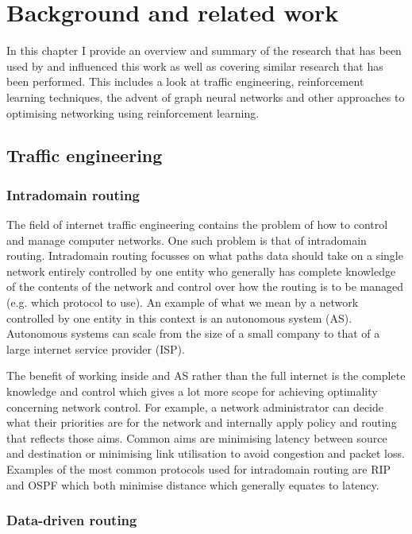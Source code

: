 \chapter{Background and related work}
\label{chapter:background}

In this chapter I provide an overview and summary of the research that has been used by and influenced this work as well as covering similar research that has been performed. This includes a look at traffic engineering, reinforcement learning techniques, the advent of graph neural networks and other approaches to optimising networking using reinforcement learning.


\section{Traffic engineering}

\subsection{Intradomain routing}

The field of internet traffic engineering contains the problem of how to control and manage computer networks. One such problem is that of intradomain routing. Intradomain routing focusses on what paths data should take on a single network entirely controlled by one entity who generally has complete knowledge of the contents of the network and control over how the routing is to be managed (e.g. which protocol to use). An example of what we mean by a network controlled by one entity in this context is an autonomous system (AS). Autonomous systems can scale from the size of a small company to that of a large internet service provider (ISP).

The benefit of working inside and AS rather than the full internet is the complete knowledge and control which gives a lot more scope for achieving optimality concerning network control. For example, a network administrator can decide what their priorities are for the network and internally apply policy and routing that reflects those aims. Common aims are minimising latency between source and destination or minimising link utilisation to avoid congestion and packet loss. Examples of the most common protocols used for intradomain routing are RIP\cite{rfc2080} and OSPF\cite{rfc5340} which both minimise distance which generally equates to latency.

\subsection{Data-driven routing}

